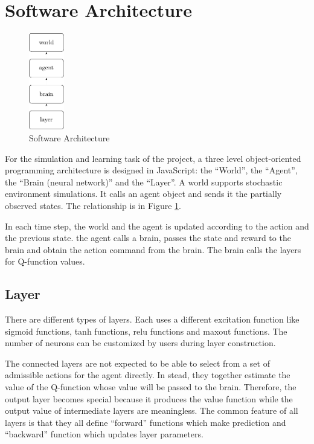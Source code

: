 \documentclass[conference,compsoc]{IEEEtran}
\begin{document}
\section{Software Architecture}
\begin{figure}[!t]
\centering
\includegraphics[width=0.6in]{softwareArchitecture}
\caption{Software Architecture}
\label{softwareArchitecture}
\end{figure}
For the simulation and learning task of the project, a three level object-oriented programming architecture is designed in JavaScript: the ``World'', the ``Agent'', the ``Brain (neural network)'' and the ``Layer''. A world supports stochastic environment simulations. It calls an agent object and sends it the partially observed states. The relationship is in Figure \ref{softwareArchitecture}. 

In each time step, the world and the agent is updated according to the action and the previous state. the agent calls a brain, passes the state and reward to the brain and obtain the action command from the brain. The brain calls the layers for Q-function values. 

\subsection{Layer}
There are different types of layers. Each uses a different excitation function like sigmoid functions, tanh functions, relu functions and maxout functions. The number of neurons can be customized by users during layer construction. 

The connected layers are not expected to be able to select from a set of admissible actions for the agent directly. In stead, they together estimate the value of the Q-function whose value will be passed to the brain. Therefore, the output layer becomes special because it produces the value function while the output value of intermediate layers are meaningless. The common feature of all layers is that they all define ``forward'' functions which make prediction and ``backward'' function which updates layer parameters. 
\end{document}
